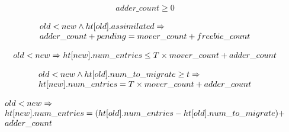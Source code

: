 \begin{lemma}
    \begin{equation*}
\begin{array}{l}      
  adder\_count \geq 0
\end{array}
    \end{equation*}  
    \label{posted0}  
\end{lemma}

\begin{lemma}
  \begin{equation*}
    \begin{array}{l}      
      old < new \wedge \mbox{$ht[old]$}.assimilated \Rightarrow \\
      adder\_count+ pending = mover\_count + freebie\_count
    \end{array}
  \end{equation*}    
  \label{posted1}
\end{lemma}

\begin{lemma}
  \begin{equation*}
    \begin{array}{l}      
      old < new \Rightarrow \mbox{$ht[new]$}.num\_entries \leq T \times mover\_count + adder\_count
    \end{array}
  \end{equation*}  
  \label{upper_strengthening1}
\end{lemma}

\begin{lemma}
\begin{equation*}
\begin{array}{l}  
  old < new \wedge \mbox{$ht[old]$}.num\_to\_migrate \geq t \Rightarrow
  \\ \mbox{$ht[new]$}.num\_entries = T \times mover\_count + adder\_count
\end{array}
\end{equation*}
\label{upper_strengthening2}  
\end{lemma}

\begin{lemma}
  \begin{equation*}
    \begin{array}{l}  
      old < new \Rightarrow \\
      \mbox{$ht[new]$}.num\_entries = (\mbox{$ht[old]$}.num\_entries - \mbox{$ht[old]$}.num\_to\_migrate) + \\
       adder\_count
\end{array}
\end{equation*}
  \label{upper_strengthening3}  
\end{lemma}

